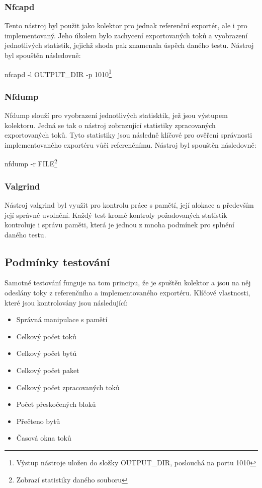 \documentclass[11pt, a4paper, hidelinks]{article}[08.10.2023]
\begin{document}
    \subsubsection{Nfcapd}\label{collector}
    Tento nástroj byl použit jako kolektor pro jednak referenční exportér, ale i pro implementovaný. Jeho úkolem bylo zachycení exportovaných toků a vyobrazení jednotlivých statistik, jejichž shoda pak znamenala úspěch daného testu.
    Nástroj byl spouštěn následovně:

    \begin{center}
        nfcapd -l OUTPUT\_DIR -p 1010\footnote{Výstup nástroje uložen do složky OUTPUT\_DIR, poslouchá na portu 1010}
    \end{center}

    \subsubsection{Nfdump}
    Nfdump slouží pro vyobrazení jednotlivých statisktik, jež jsou výstupem kolektoru. 
    Jedná se tak o nástroj zobrazující statistiky zpracovaných exportovaných toků. Tyto statistiky jsou následně klíčové pro ověření správnosti implementovaného exportéru vůči referenčnímu.
    Nástroj byl spouštěn následovně:
    \begin{center}
        nfdump -r FILE\footnote{Zobrazí statistiky daného souboru}
    \end{center}

    \subsubsection{Valgrind}
    Nástroj valgrind byl využit pro kontrolu práce s pamětí, její alokace a především její správné uvolnění. Každý test kromě kontroly požadovaných statistik kontroluje i správu paměti, která je jednou z mnoha podmínek pro splnění daného testu.
    \subsection{Podmínky testování}\label{test_podm}
    Samotné testování funguje na tom principu, že je spuštěn kolektor a jsou na něj odeslány toky z referenčního a implementovaného exportéru. Klíčové vlastnosti, které jsou kontrolovány jsou následující:
    \begin{itemize}
        \item{Správná manipulace s pamětí}
        \item{Celkový počet toků}
        \item{Celkový počet bytů}
        \item{Celkový počet paket}
        \item{Celkový počet zpracovaných toků}
        \item{Počet přeskočených bloků}
        \item{Přečteno bytů}
        \item{Časová okna toků}
    \end{itemize}
\end{document}
